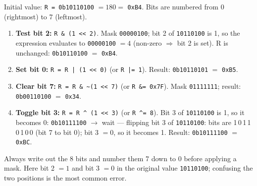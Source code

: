 \documentclass[11pt]{article}
\begin{document}
\begin{corrige}
Initial value: \texttt{R = 0b10110100} $= 180 =$ \texttt{0xB4}. Bits are numbered from 0 (rightmost) to 7 (leftmost).

\begin{enumerate}
\item \textbf{Test bit 2:} \texttt{R \& (1 << 2)}. Mask \texttt{00000100}; bit 2 of \texttt{10110100} is 1, so the expression evaluates to \texttt{00000100} $= 4$ (non-zero $\Rightarrow$ bit 2 is set). R is unchanged: \texttt{0b10110100} $=$ \texttt{0xB4}.
\item \textbf{Set bit 0:} \texttt{R = R | (1 << 0)} (or \texttt{R |= 1}). Result: \texttt{0b10110101} $=$ \texttt{0xB5}.
\item \textbf{Clear bit 7:} \texttt{R = R \& \textasciitilde(1 << 7)} (or \texttt{R \&= 0x7F}). Mask \texttt{01111111}; result: \texttt{0b00110100} $=$ \texttt{0x34}.
\item \textbf{Toggle bit 3:} \texttt{R = R \^{} (1 << 3)} (or \texttt{R \^{}= 8}). Bit 3 of \texttt{10110100} is 1, so it becomes 0: \texttt{0b10111100} $\rightarrow$ wait — flipping bit 3 of \texttt{10110100}: bits are 1\,0\,1\,1\,0\,1\,0\,0 (bit 7 to bit 0); bit 3 $=0$, so it becomes 1. Result: \texttt{0b10111100} $=$ \texttt{0xBC}.
\end{enumerate}

\begin{attention}
Always write out the 8 bits and number them 7 down to 0 before applying a mask. Here bit 2 $=1$ and bit 3 $=0$ in the original value \texttt{10110100}; confusing the two positions is the most common error.
\end{attention}
\end{corrige}
\end{document}
